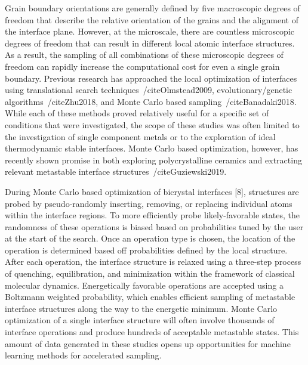 \documentclass[aip,reprint,longbibliography,amsmath,amssymb,twocolumn,superscriptaddress]{revtex4-1}
\begin{document}
Grain boundary orientations are generally defined by five macroscopic degrees of freedom that describe the relative orientation of the grains and the alignment of the interface plane. 
%
However, at the microscale, there are countless microscopic degrees of freedom that can result in different local atomic interface structures. 
%
As a result, the sampling of all combinations of these microscopic degrees of freedom can rapidly increase the computational cost for even a single grain boundary. 
%
Previous research has approached the local optimization of interfaces using translational search techniques~/cite{Olmstead2009}, evolutionary/genetic algorithms~/cite{Zhu2018}, and Monte Carlo based sampling~/cite{Banadaki2018}.
%
While each of these methods proved relatively useful for a specific set of conditions that were investigated, the scope of these studies was often limited to the investigation of single component metals or to the exploration of ideal thermodynamic stable interfaces. 
%
Monte Carlo based optimization, however, has recently shown promise in both exploring polycrystalline ceramics and extracting relevant metastable interface structures~/cite{Guziewski2019}. 

During Monte Carlo based optimization of bicrystal interfaces [8], structures are probed by pseudo-randomly inserting, removing, or replacing individual atoms within the interface regions. 
%
To more efficiently probe likely-favorable states, the randomness of these operations is biased based on probabilities tuned by the user at the start of the search. 
%
Once an operation type is chosen, the location of the operation is determined based off probabilities defined by the local structure. 
%
After each operation, the interface structure is relaxed using a three-step process of quenching, equilibration, and minimization within the framework of classical molecular dynamics. 
%
Energetically favorable operations are accepted using a Boltzmann weighted probability, which enables efficient sampling of metastable interface structures along the way to the energetic minimum. 
%
Monte Carlo optimization of a single interface structure will often involve thousands of interface operations and produce hundreds of acceptable metastable states. 
%
This amount of data generated in these studies opens up opportunities for machine learning methods for accelerated sampling.  
\end{document}
